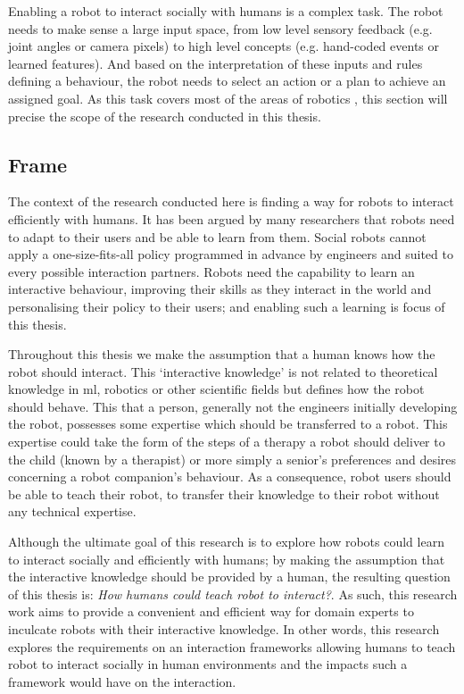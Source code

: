 

Enabling a robot to interact socially with humans is a complex task. The robot needs to make sense a large input space, from low level sensory feedback (e.g. joint angles or camera pixels) to high level concepts (e.g. hand-coded events or learned features). And based on the interpretation of these inputs and rules defining a behaviour, the robot needs to select an action or a plan to achieve an assigned goal. As this task covers most of the areas of robotics \cite{fong2003survey}, this section will precise the scope of the research conducted in this thesis.

\subsection{Frame}

The context of the research conducted here is finding a way for robots to interact efficiently with humans. It has been argued by many researchers  \citep{dautenhahn2004robots,billard2008robot} that robots need to adapt to their users and be able to learn from them. Social robots cannot apply a one-size-fits-all policy programmed in advance by engineers and suited to every possible interaction partners. Robots need the capability to learn an interactive behaviour, improving their skills as they interact in the world and personalising their policy to their users; and enabling such a learning is focus of this thesis.

Throughout this thesis we make the assumption that a human knows how the robot should interact. This `interactive knowledge' is not related to theoretical knowledge in \gls{ml}, robotics or other scientific fields but defines how the robot should behave. This that a person, generally not the engineers initially developing the robot, possesses some expertise which should be transferred to a robot. This expertise could take the form of the steps of a therapy a robot should deliver to the child (known by a therapist) or more simply a senior's preferences and desires concerning a robot companion's behaviour. As a consequence, robot users should be able to teach their robot, to transfer their knowledge to their robot without any technical expertise.

Although the ultimate goal of this research is to explore how robots could learn to interact socially and efficiently with humans; by making the assumption that the interactive knowledge should be provided by a human, the resulting question of this thesis is: \emph{How humans could teach robot to interact?}. As such, this research work aims to provide a convenient and efficient way for domain experts to inculcate robots with their interactive knowledge. In other words, this research explores the requirements on an interaction frameworks allowing humans to teach robot to interact socially in human environments and the impacts such a framework would have on the interaction.

